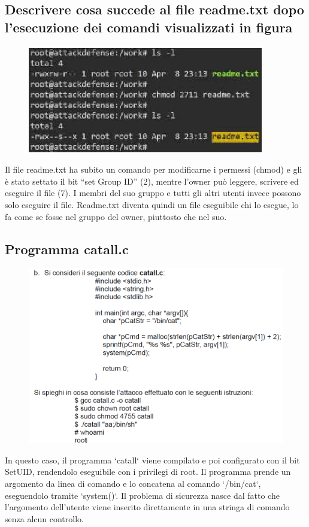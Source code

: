 \documentclass{report}
\begin{document}
\subsection{Descrivere cosa succede al file readme.txt dopo l’esecuzione dei comandi visualizzati in figura}
\begin{figure}[H]
    \centering
    \includegraphics[width=0.8\linewidth]{images/readme.png}
\end{figure}
Il file readme.txt ha subito un comando per modificarne i permessi (chmod) e gli è stato settato il bit “set Group ID” (2), mentre l’owner può leggere, scrivere ed eseguire il file (7). I membri del suo gruppo e tutti gli altri utenti invece possono solo eseguire il file.
Readme.txt diventa quindi un file eseguibile chi lo esegue, lo fa come se fosse nel gruppo del owner, piuttosto che nel suo.

\subsection{Programma catall.c}
\begin{figure}[H]
    \centering
    \includegraphics[width=0.8\linewidth]{images/setuidsettembre2024.png}
\end{figure}
In questo caso, il programma `catall` viene compilato e poi configurato con il bit SetUID, rendendolo eseguibile con i privilegi di root. Il programma prende un argomento da linea di comando e lo concatena al comando `/bin/cat`, eseguendolo tramite `system()`. Il problema di sicurezza nasce dal fatto che l’argomento dell’utente viene inserito direttamente in una stringa di comando senza alcun controllo.
\end{document}
